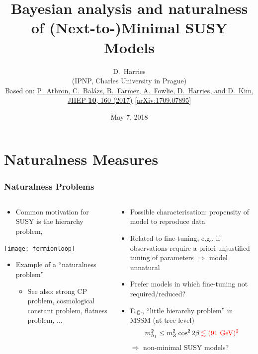\documentclass[10pt,aspectratio=169]{beamer}
\title{Bayesian analysis and naturalness of (Next-to-)Minimal SUSY Models}
\author{D.~Harries\\
  {\scriptsize
    (IPNP, Charles University in Prague)}\\
  \vspace{25pt}
  { \scriptsize
    Based on: \href{https://doi.org/10.1007/JHEP10(2017)160}{%
      P.~Athron, C.~Bal\'{a}zs, B.~Farmer, A.~Fowlie, D.~Harries,
      and D.~Kim, JHEP \textbf{10}, 160 (2017)}
    [\href{http://arxiv.org/abs/1709.07895}{arXiv:1709.07895}]
  }
}
\date[Phenomenology 2018, University of Pittsburgh]{May 7, 2018}
\begin{document}
\begin{frame}[plain]
  \titlepage
\end{frame}

\section{Naturalness Measures}

\begin{frame}
  \frametitle{Naturalness Problems}
  \begin{columns}[t]
    \begin{column}{0.5\textwidth}
      \begin{itemize} \itemsep1em
        \item Common motivation for SUSY is the hierarchy problem,
      \end{itemize}
      \begin{center}
        \texttt{[image: fermionloop]}
      \end{center}
      \begin{itemize} \itemsep1em
      \item Example of a \alert{``naturalness problem''}
        \begin{itemize}
        \item See also: strong CP problem, cosmological constant
          problem, flatness problem, $\ldots$
        \end{itemize}
      \end{itemize}
    \end{column}
    \begin{column}{0.5\textwidth}
      \begin{itemize} \itemsep1.5em
      \item Possible characterisation: {\color{blue} propensity of model to
        reproduce data}
      \item Related to \alert{fine-tuning}, e.g., if observations require
        a priori unjustified tuning of parameters $\Rightarrow$ model
        unnatural
      \item Prefer models in which fine-tuning not required/reduced?
      \item E.g., ``little hierarchy problem'' in MSSM
        (at tree-level)
        \begin{equation*}
          m_{h_1}^2 \leq m_Z^2 \cos^2 2\beta \, { \color{red} \lesssim
            (91 \text{ GeV})^2}
        \end{equation*}
        {\color{blue} $\Rightarrow$ non-minimal SUSY models?}
      \end{itemize}
    \end{column}
  \end{columns}
\end{frame}
\end{document}
